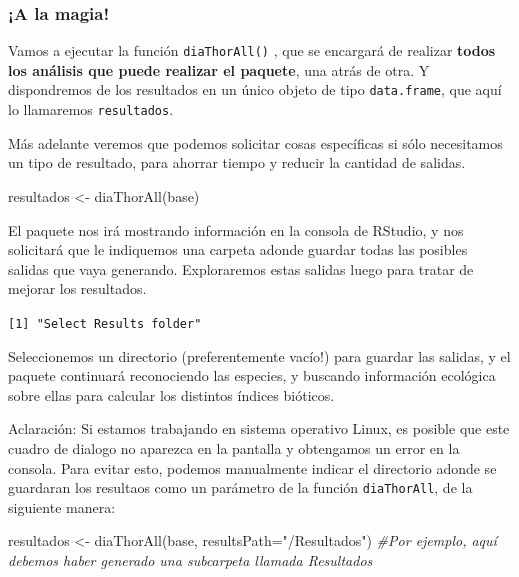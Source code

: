 \documentclass[
]{book}
\newenvironment{Shaded}{\begin{snugshade}}{\end{snugshade}}
\newcommand{\AttributeTok}[1]{\textcolor[rgb]{0.77,0.63,0.00}{#1}}
\newcommand{\CommentTok}[1]{\textcolor[rgb]{0.56,0.35,0.01}{\textit{#1}}}
\newcommand{\FunctionTok}[1]{\textcolor[rgb]{0.00,0.00,0.00}{#1}}
\newcommand{\NormalTok}[1]{#1}
\newcommand{\OtherTok}[1]{\textcolor[rgb]{0.56,0.35,0.01}{#1}}
\newcommand{\StringTok}[1]{\textcolor[rgb]{0.31,0.60,0.02}{#1}}
\begin{document}
\hypertarget{a-la-magia}{%
\subsubsection{\texorpdfstring{\textbf{¡A la magia!}}{¡A la magia!}}\label{a-la-magia}}

Vamos a ejecutar la función \texttt{diaThorAll()} , que se encargará de realizar \textbf{todos los análisis que puede realizar el paquete}, una atrás de otra. Y dispondremos de los resultados en un único objeto de tipo \texttt{data.frame}, que aquí lo llamaremos \texttt{resultados}.

Más adelante veremos que podemos solicitar cosas específicas si sólo necesitamos un tipo de resultado, para ahorrar tiempo y reducir la cantidad de salidas.

\begin{Shaded}
\begin{Highlighting}[]
\NormalTok{resultados }\OtherTok{\textless{}{-}} \FunctionTok{diaThorAll}\NormalTok{(base)}
\end{Highlighting}
\end{Shaded}

El paquete nos irá mostrando información en la consola de RStudio, y nos solicitará que le indiquemos una carpeta adonde guardar todas las posibles salidas que vaya generando. Exploraremos estas salidas luego para tratar de mejorar los resultados.

\texttt{{[}1{]}\ "Select\ Results\ folder"}

Seleccionemos un directorio (preferentemente vacío!) para guardar las salidas, y el paquete continuará reconociendo las especies, y buscando información ecológica sobre ellas para calcular los distintos índices bióticos.

Aclaración: Si estamos trabajando en sistema operativo Linux, es posible que este cuadro de dialogo no aparezca en la pantalla y obtengamos un error en la consola. Para evitar esto, podemos manualmente indicar el directorio adonde se guardaran los resultaos como un parámetro de la función \texttt{diaThorAll}, de la siguiente manera:

\begin{Shaded}
\begin{Highlighting}[]
\NormalTok{resultados }\OtherTok{\textless{}{-}} \FunctionTok{diaThorAll}\NormalTok{(base, }\AttributeTok{resultsPath=}\StringTok{"/Resultados"}\NormalTok{) }\CommentTok{\#Por ejemplo, aquí debemos haber generado una subcarpeta llamada \textquotesingle{}Resultados\textquotesingle{}}
\end{Highlighting}
\end{Shaded}
\end{document}
